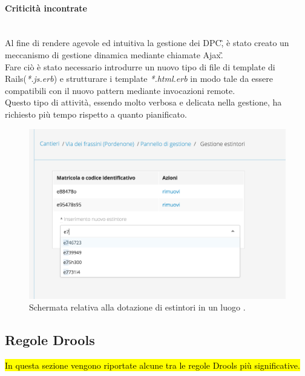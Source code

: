 	\paragraph*{Criticità incontrate}\mbox{}\\
	Al fine di rendere agevole ed intuitiva la gestione dei \gls{DPC}\G, è stato creato un meccanismo di gestione dinamica mediante chiamate \gls{Ajax}\G. \\
	Fare ciò è stato necessario introdurre un nuovo tipo di file di template di Rails(\textit{*.js.erb}) e strutturare i template \textit{*.html.erb} in modo tale da essere compatibili con il nuovo pattern mediante invocazioni remote.\\
	Questo tipo di attività, essendo molto verbosa e delicata nella gestione, ha richiesto più tempo rispetto a quanto pianificato.
		\begin{figure}[H]
			\begin{center}
				\includegraphics[width=12cm]{Pics/ScreenRemoteTrueEstintori.png}
				\caption{Schermata relativa alla dotazione di estintori in un luogo .}
				\label{fig:ScreenRemoteTrueEstintori}
			\end{center}
		\end{figure}
		

\newpage
\subsection{Regole Drools}
\label{Drools:regole}
\hl{In questa sezione vengono riportate alcune tra le regole Drools più significative.}
